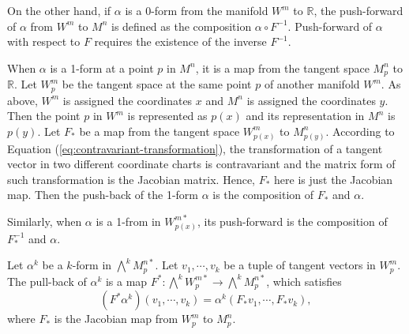 \documentclass[11pt, a4paper]{book}
\begin{document}
On the other hand, if $\alpha$ is a 0-form from the manifold $W^m$ to $\mathbb{R}$, the
push-forward of $\alpha$ from $W^m$ to $M^n$ is defined as the composition
$\alpha \circ F^{-1}$. Push-forward of $\alpha$ with respect to $F$ requires the existence
of the inverse $F^{-1}$.
\begin{center}
\end{center}

When $\alpha$ is a 1-form at a point $p$ in $M^n$, it is a map from the tangent space
$M_p^n$ to $\mathbb{R}$. Let $W_p^m$ be the tangent space at the same point $p$ of another
manifold $W^m$. As above, $W^m$ is assigned the coordinates $x$ and $M^n$ is assigned the
coordinates $y$. Then the point $p$ in $W^m$ is represented as $p(x)$ and its
representation in $M^n$ is $p(y)$. Let $F_{*}$ be a map from the tangent space
$W_{p(x)}^m$ to $M_{p(y)}^n$. According to Equation
(\ref{eq:contravariant-transformation}), the transformation of a tangent vector in two
different coordinate charts is contravariant and the matrix form of such transformation is
the Jacobian matrix. Hence, $F_{*}$ here is just the Jacobian map. Then the push-back of the
1-form $\alpha$ is the composition of $F_{*}$ and $\alpha$.

\begin{center}
\end{center}

Similarly, when $\alpha$ is a 1-from in $W_{p(x)}^{m*}$, its push-forward is the
composition of $F_{*}^{-1}$ and $\alpha$.

\begin{center}
\end{center}

\begin{Definition}
  \label{def:pullback-k-form}
  Let $\alpha^k$ be a $k$-form in $\bigwedge^k M_p^{n*}$. Let $v_1,\cdots,v_k$ be a tuple
  of tangent vectors in $W_p^m$. The pull-back of $\alpha^k$ is a map
  $F^{*}: \bigwedge^k W_p^{m*} \rightarrow \bigwedge^k M_p^{n*}$, which satisfies
  \begin{equation}
    \label{eq:pullback-k-form}
    \left( F^{*}\alpha^k \right)(v_1,\cdots,v_k) = \alpha^k(F_{*}v_1,\cdots,F_{*}v_k),
  \end{equation}
  where $F_{*}$ is the Jacobian map from $W_p^m$ to $M_p^n$.
\end{Definition}
\end{document}
